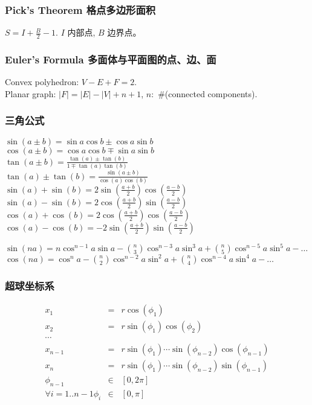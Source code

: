 \begin{small}
\begin{spacing}{0.5}
\begin{multicols*}{2}
\subsubsection{Pick's Theorem 格点多边形面积}
$S=I+\frac{B}{2}-1.$ $I$ 内部点, $B$ 边界点。
\subsubsection{Euler's Formula 多面体与平面图的点、边、面}
Convex polyhedron: $V-E+F=2$. \\
Planar graph: $|F|=|E|-|V|+n+1$, $n:$ \#(connected components).
\end{multicols*}
\subsubsection{三角公式}
\noindent
\begin{multicols*}{2}
	
$
\sin(a \pm b) = \sin a \cos b \pm \cos a \sin b
$ \\
$
\cos(a \pm b) = \cos a \cos b \mp \sin a \sin b
$ \\
$
\tan(a \pm b) = \frac{\tan(a)\pm\tan(b)}{1 \mp \tan(a)\tan(b)}
$ \\
$
\tan(a) \pm \tan(b) = \frac{\sin(a \pm b)}{\cos(a)\cos(b)}
$ \\
$
\sin(a) + \sin(b) = 2\sin(\frac{a + b}{2})\cos(\frac{a - b}{2})
$ \\
$
\sin(a) - \sin(b) = 2\cos(\frac{a + b}{2})\sin(\frac{a - b}{2})
$ \\
$
\cos(a) + \cos(b) = 2\cos(\frac{a + b}{2})\cos(\frac{a - b}{2})
$ \\
$
\cos(a) - \cos(b) = -2\sin(\frac{a + b}{2})\sin(\frac{a - b}{2})
$
\end{multicols*}
$
\sin(na) = n\cos^{n-1}a\sin a - \binom{n}{3}\cos^{n-3}a \sin^3a + \binom{n}{5}\cos^{n-5}a\sin^5a - \dots
$\\
$
\cos(na) = \cos^{n}a - \binom{n}{2}\cos^{n-2}a \sin^2a + \binom{n}{4}\cos^{n-4}a\sin^4a - \dots
$
\subsubsection{超球坐标系}
\begin{eqnarray*}
 	x_1 &=& r\cos(\phi_1) \\ 
	x_2 &=& r\sin(\phi_1)\cos(\phi_2) \\
	\cdots\\
	x_{n-1} &=& r\sin(\phi_1)\cdots\sin(\phi_{n-2})\cos(\phi_{n-1}) \\
	x_n &=& r\sin(\phi_1)\cdots\sin(\phi_{n-2})\sin(\phi_{n-1}) \\
	\phi_{n-1} &\in& [0,2\pi]\\
	\forall {i=1..{n-1}}\phi_i &\in& [0,\pi]\\
\end{eqnarray*}

\end{spacing}
\end{small}
